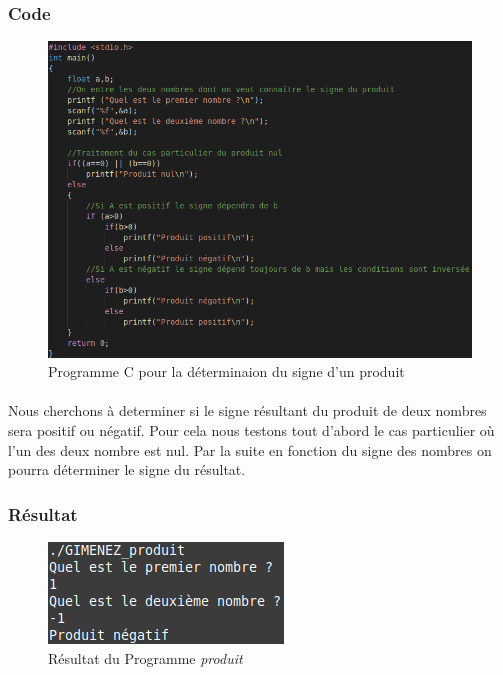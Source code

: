\documentclass[10pt,a4paper]{article}
\begin{document}
\subsubsection{Code}
    \begin{figure}[h]
	\begin{center}
	\includegraphics[scale=.3]{images/produit_c}
	\end{center}
	\caption{Programme C pour la déterminaion du signe d'un produit}
	\end{figure}
\paragraph{}
	Nous cherchons à determiner si le signe résultant du produit de deux nombres sera positif
	ou négatif. Pour cela nous testons tout d'abord le cas particulier où l'un des deux 
	nombre est nul. Par la suite en fonction du signe des nombres on pourra déterminer le signe 
	du résultat.
\subsubsection{Résultat}
	\begin{figure}[h]
	\begin{center}
	\includegraphics[scale=.3]{images/produit_ex}
	\end{center}
	\caption{Résultat du Programme \emph{produit}}
	\end{figure}
\end{document}
